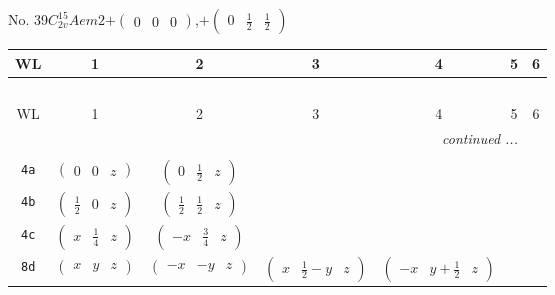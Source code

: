 \documentclass[fleqn,9pt,landscape]{jsarticle}
\begin{document}
\newpage
No. 39\quad$C_{2v}^{15}$\quad$Aem2$\quad[ orthorhombic ]\quad$+\begin{pmatrix} 0 & 0 & 0 \end{pmatrix}$,\quad $+\begin{pmatrix} 0 & \frac{1}{2} & \frac{1}{2} \end{pmatrix}$
\begin{center}
\renewcommand{\arraystretch}{1.2}
\begin{longtable}{ccccccc}
 \hline \hline
WL & 1 & 2 & 3 & 4 & 5 & 6 \\ \hline \endfirsthead

\multicolumn{6}{l}{\tablename\ \thetable{}} \\
 \hline \hline
WL & 1 & 2 & 3 & 4 & 5 & 6 \\ \hline \endhead

 \hline \hline
\multicolumn{6}{r}{\footnotesize\it continued ...} \\ \endfoot

 \hline \hline
\multicolumn{6}{r}{} \\ \endlastfoot

{\tt 4a} & $ \begin{pmatrix} 0 & 0 & z \end{pmatrix} $ & $ \begin{pmatrix} 0 & \frac{1}{2} & z \end{pmatrix} $ & $  $ & $  $ \\ \hline
{\tt 4b} & $ \begin{pmatrix} \frac{1}{2} & 0 & z \end{pmatrix} $ & $ \begin{pmatrix} \frac{1}{2} & \frac{1}{2} & z \end{pmatrix} $ & $  $ & $  $ \\ \hline
{\tt 4c} & $ \begin{pmatrix} x & \frac{1}{4} & z \end{pmatrix} $ & $ \begin{pmatrix} - x & \frac{3}{4} & z \end{pmatrix} $ & $  $ & $  $ \\ \hline
{\tt 8d} & $ \begin{pmatrix} x & y & z \end{pmatrix} $ & $ \begin{pmatrix} - x & - y & z \end{pmatrix} $ & $ \begin{pmatrix} x & \frac{1}{2} - y & z \end{pmatrix} $ & $ \begin{pmatrix} - x & y + \frac{1}{2} & z \end{pmatrix} $ \\
\end{longtable}
\end{center}
\end{document}
